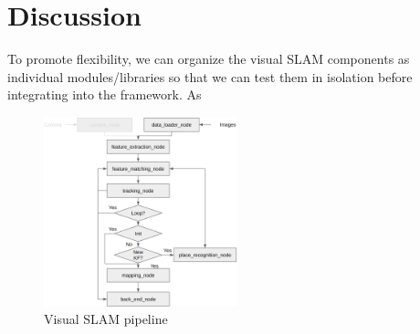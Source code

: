 \section{Discussion}
To promote flexibility, we can organize the visual SLAM components as individual modules/libraries so that we can test them in isolation before integrating into the framework. As

\begin{figure}[h]
    \centering
    \includegraphics[width=0.5\textwidth]{img/pipeline.png}
    \caption{Visual SLAM pipeline}
    \label{fig:vslam_pipeline}
\end{figure}

